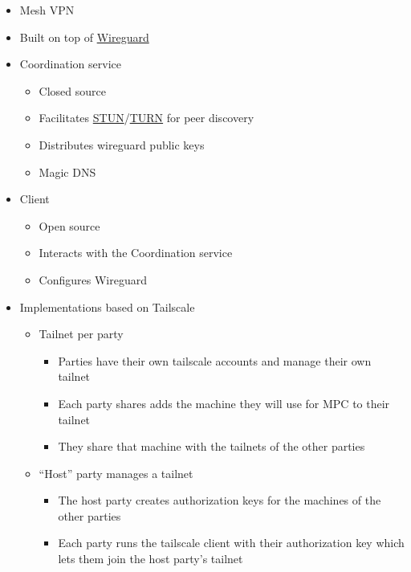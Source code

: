 \begin{itemize}
\tightlist
\item
  Mesh VPN
\item
  Built on top of \href{notes/02051-wireguard.md}{Wireguard}
\item
  Coordination service

  \begin{itemize}
  \tightlist
  \item
    Closed source
  \item
    Facilitates
    \href{notes/0202-nat\#Session\%20Traversal\%20Utilities\%20for\%20NAT\%20(STUN)}{STUN}/\href{notes/02021-internet-protocol.md\#test}{TURN}
    for peer discovery
  \item
    Distributes wireguard public keys
  \item
    Magic DNS
  \end{itemize}
\item
  Client

  \begin{itemize}
  \tightlist
  \item
    Open source
  \item
    Interacts with the Coordination service
  \item
    Configures Wireguard
  \end{itemize}
\item
  Implementations based on Tailscale

  \begin{itemize}
  \tightlist
  \item
    Tailnet per party

    \begin{itemize}
    \tightlist
    \item
      Parties have their own tailscale accounts and manage their own
      tailnet
    \item
      Each party shares adds the machine they will use for MPC to their
      tailnet
    \item
      They share that machine with the tailnets of the other parties
    \end{itemize}
  \item
    ``Host'' party manages a tailnet

    \begin{itemize}
    \tightlist
    \item
      The host party creates authorization keys for the machines of the
      other parties
    \item
      Each party runs the tailscale client with their authorization key
      which lets them join the host party's tailnet
    \end{itemize}
  \end{itemize}
\end{itemize}

